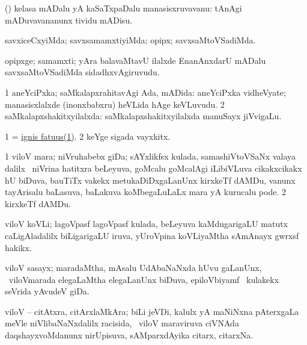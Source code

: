 \noindent
\gl{\pagu}
\bmng
{} (\rUpa) kelasa mADalu yA kaSaTxpaDalu manasisxruvavanu:  tAnAgi mADuvavananunx tividu mADisu. 
\emng
\eentry

\bentry
{}
\gl{\kirxvi}
\bmng
savxiceCxyiMda; savxsamamxtiyiMda; opipx; savxsaMtoVSadiMda. 
\emng
\eentry

\bentry
{}
\gl{\nA}
\bmng
opipxge; samamxti; yAra balavaMtavU ilalxde EnanAnxdarU mADalu savxsaMtoVSadiMda sidadhxvAgiruvudu. 
\emng
\eentry

\bentry
{} 
\gl{\gu}
\expl{}
\bmng
\bnum
\num{1} aneYciPxka; saMkalapxrahitavAgi Ada, mADida:  aneYciPxka vidheVyate; manasisxlalxde (inonxbabxru) heVLida hAge keVLuvudu. 
\num{2} saMkalapxshakitxyilalxda:  saMkalapxshakitxyilalxda manuSayx jiVvigaLu. 
\enum
\emng
\eentry

\bentry
{} 
\gl{\nA}
\expl{}
\bmng
\bnum
\num{1} = \hyperref{kandict_i.pdf}{I}{ignis fatuus(1)}{ignis fatuus(1)}. 
\num{2} keYge sigada vayxkitx. 
\enum
\emng
\eentry

\bentry
{}
\gl{\nA}
\bmng
\bnum
\num{1} viloV mara; niVruhabebx giDa; sAYxlikfsx kulada, samashiVtoVSaNx valaya dalilx \sA\ niVrina hatitxra beLeyuva, goMcalu goMcalAgi iLibiVLuva cikakxcikakx hU biDuva, bauTiTx \mo vakekx metukaDiDxgaLanUnx kirxkeTf dAMDu, \mo vanunx tayArisalu baLasuva, baLakuva koMbegaLuLaLx mara yA kurucalu pode. 
\num{2} kirxkeTf dAMDu. 
\enum
\emng
\eentry

\bentry
{}
\gl{\nA}
\bmng
{viloV koVLi; lagoVpasf lagoVpasf kulada, beLeyuva kaMdugarigaLU matutx caLigAladalilx biLigarigaLU iruva, yUroVpina koVLiyaMtha sAmAnayx gwrxsf hakikx.} 
\emng
\eentry

\bentry
{}
\gl{\nA}
\bmng
viloV sasayx; maradaMtha, mAsalu UdAbaNaNxda hUvu gaLanUnx, \kanmu\ viloVmarada elegaLaMtha elegaLanUnx biDuva, epiloVbiyamf \mo\ kulakekx seVrida yAvudeV giDa. 
\emng
\eentry

\bentry
{}
\gl{\nA}
\bmng
viloV -- citAtxra, citArxlaMkAra; biLi jeVDi, kalulx yA maNiNxna pAterxgaLa meVle niVlibaNaNxdalilx racisida, \sA\ viloV maraviruva ciVNAda daqshayxvoMdanunx nirUpisuva, sAMparxdAyika citarx, citarxNa. 
\emng
\eentry


